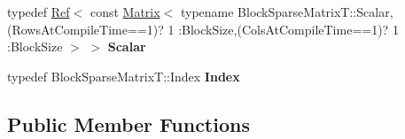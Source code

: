 \begin{DoxyCompactItemize}
\mbox{\label{class_eigen_1_1_block_vector_view_a25a7cfe0ac968241fd19f09d0a4eb67c}} 
typedef \hyperlink{group___core___module_class_eigen_1_1_ref}{Ref}$<$ const \hyperlink{group___core___module_class_eigen_1_1_matrix}{Matrix}$<$ typename Block\+Sparse\+Matrix\+T\+::\+Scalar,(Rows\+At\+Compile\+Time==1)? 1 \+:Block\+Size,(Cols\+At\+Compile\+Time==1)? 1 \+:Block\+Size $>$ $>$ {\bfseries Scalar}
\item 
\mbox{\label{class_eigen_1_1_block_vector_view_a2bd6af16b910d137e1c608ff3e441786}} 
typedef Block\+Sparse\+Matrix\+T\+::\+Index {\bfseries Index}
\end{DoxyCompactItemize}
\subsection*{Public Member Functions}
